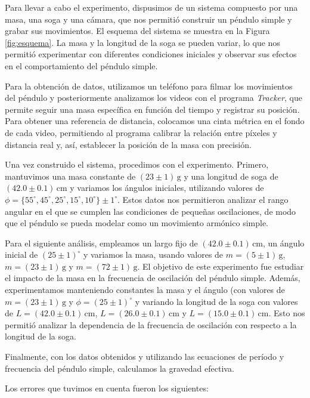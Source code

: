 \documentclass[12pt,a4]{article}
\begin{document}
Para llevar a cabo el experimento, dispusimos de un sistema compuesto por una masa, una soga y una cámara, que nos permitió construir un péndulo simple y grabar sus movimientos. El esquema del sistema se muestra en la Figura \ref{fig:esquema}. La masa y la longitud de la soga se pueden variar, lo que nos permitió experimentar con diferentes condiciones iniciales y observar sus efectos en el comportamiento del péndulo simple.

Para la obtención de datos, utilizamos un teléfono para filmar los movimientos del péndulo y posteriormente analizamos los videos con el programa \textit{Tracker}, que permite seguir una masa específica en función del tiempo y registrar su posición. Para obtener una referencia de distancia, colocamos una cinta métrica en el fondo de cada video, permitiendo al programa calibrar la relación entre píxeles y distancia real y, así, establecer la posición de la masa con precisión.

Una vez construido el sistema, procedimos con el experimento. Primero, mantuvimos una masa constante de $(23 \pm 1) \, \text{g}$ y una longitud de soga de $(42.0 \pm 0.1) \, \text{cm}$ y variamos los ángulos iniciales, utilizando valores de $\phi = \{55^\circ, 45^\circ, 25^\circ, 15^\circ, 10^\circ\} \pm 1^\circ$. Estos datos nos permitieron analizar el rango angular en el que se cumplen las condiciones de pequeñas oscilaciones, de modo que el péndulo se pueda modelar como un movimiento armónico simple.

Para el siguiente análisis, empleamos un largo fijo de $(42.0 \pm 0.1) \, \text{cm}$, un ángulo inicial de $(25 \pm 1)^\circ$ y variamos la masa, usando valores de $m = (5 \pm 1) \, \text{g}$, $m = (23 \pm 1) \, \text{g}$ y $m = (72 \pm 1) \, \text{g}$. El objetivo de este experimento fue estudiar el impacto de la masa en la frecuencia de oscilación del péndulo simple. Además, experimentamos manteniendo constantes la masa y el ángulo (con valores de $m = (23 \pm 1) \, \text{g}$ y $\phi = (25 \pm 1)^\circ$ y variando la longitud de la soga con valores de $L = (42.0 \pm 0.1) \, \text{cm}$, $L = (26.0 \pm 0.1) \, \text{cm}$ y $L = (15.0 \pm 0.1) \, \text{cm}$. Esto nos permitió analizar la dependencia de la frecuencia de oscilación con respecto a la longitud de la soga.

Finalmente, con los datos obtenidos y utilizando las ecuaciones de período y frecuencia del péndulo simple, calculamos la gravedad efectiva.


Los errores que tuvimos en cuenta fueron los siguientes:
\end{document}
